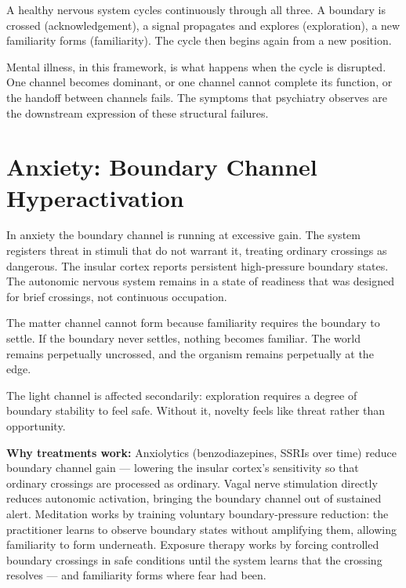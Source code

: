 \documentclass[12pt]{article}
\begin{document}
A healthy nervous system cycles continuously through all three. A boundary is
crossed (acknowledgement), a signal propagates and explores (exploration), a new
familiarity forms (familiarity). The cycle then begins again from a new position.

Mental illness, in this framework, is what happens when the cycle is disrupted.
One channel becomes dominant, or one channel cannot complete its function, or the
handoff between channels fails. The symptoms that psychiatry observes are the
downstream expression of these structural failures.

\section{Anxiety: Boundary Channel Hyperactivation}

In anxiety the boundary channel is running at excessive gain. The system
registers threat in stimuli that do not warrant it, treating ordinary crossings
as dangerous. The insular cortex reports persistent high-pressure boundary states.
The autonomic nervous system remains in a state of readiness that was designed
for brief crossings, not continuous occupation.

The matter channel cannot form because familiarity requires the boundary to
settle. If the boundary never settles, nothing becomes familiar. The world
remains perpetually uncrossed, and the organism remains perpetually at the edge.

The light channel is affected secondarily: exploration requires a degree of
boundary stability to feel safe. Without it, novelty feels like threat rather
than opportunity.

\textbf{Why treatments work:}
Anxiolytics (benzodiazepines, SSRIs over time) reduce boundary channel gain ---
lowering the insular cortex's sensitivity so that ordinary crossings are
processed as ordinary. Vagal nerve stimulation directly reduces autonomic
activation, bringing the boundary channel out of sustained alert. Meditation
works by training voluntary boundary-pressure reduction: the practitioner learns
to observe boundary states without amplifying them, allowing familiarity to form
underneath. Exposure therapy works by forcing controlled boundary crossings in
safe conditions until the system learns that the crossing resolves --- and
familiarity forms where fear had been.
\end{document}
